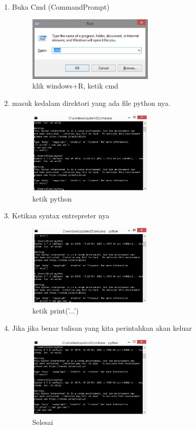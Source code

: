 \begin{enumerate}

\item Buka Cmd (CommandPrompt)
		\begin{figure}[h]
			\includegraphics[width=6cm]{figure/entrepeter.png}
			\centering
			\caption{klik windows+R, ketik cmd}
			\end{figure}

\item masuk kedalam direktori yang ada file python nya.
			\begin{figure}[h]
			\includegraphics[width=6cm]{figure/entrepreter1.png}
			\centering
			\caption{ketik python}
			\end{figure}
		\item Ketikan syntax entrepreter nya
			\begin{figure}[h]
			\includegraphics[width=6cm]{figure/entrepreter2.png}
			\centering
			\caption{ketik print('...')}
			\end{figure}

		\item Jika jika benar tulisan yang kita perintahkan akan keluar
			\begin{figure}[h]
			\includegraphics[width=6cm]{figure/entrepreter3.png}
			\centering
			\caption{Selesai}
			\end{figure}


\end{enumerate}


